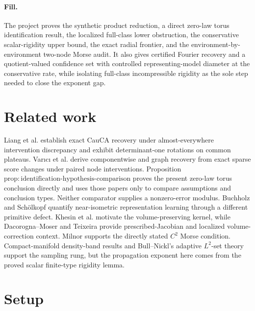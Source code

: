 \documentclass{article}
\begin{document}
\paragraph{Fill.} The project proves the synthetic product reduction, a direct zero-law torus identification result, the localized full-class lower obstruction, the conservative scalar-rigidity upper bound, the exact radial frontier, and the environment-by-environment two-node Morse audit. It also gives certified Fourier recovery and a quotient-valued confidence set with controlled representing-model diameter at the conservative rate, while isolating full-class incompressible rigidity as the sole step needed to close the exponent gap.

\section{Related work}

Liang et al. establish exact CauCA recovery under almost-everywhere intervention discrepancy and exhibit determinant-one rotations on common plateaus. Varıcı et al. derive componentwise and graph recovery from exact sparse score changes under paired node interventions. Proposition \(\mathrm{prop:identification\text{-}hypothesis\text{-}comparison}\) proves the present zero-law torus conclusion directly and uses those papers only to compare assumptions and conclusion types. Neither comparator supplies a nonzero-error modulus. Buchholz and Schölkopf quantify near-isometric representation learning through a different primitive defect. Khesin et al. motivate the volume-preserving kernel, while Dacorogna--Moser and Teixeira provide prescribed-Jacobian and localized volume-correction context. Milnor supports the directly stated \(C^2\) Morse condition. Compact-manifold density-band results and Bull--Nickl's adaptive \(L^2\)-set theory support the sampling rung, but the propagation exponent here comes from the proved scalar finite-type rigidity lemma.

\section{Setup}
\end{document}
